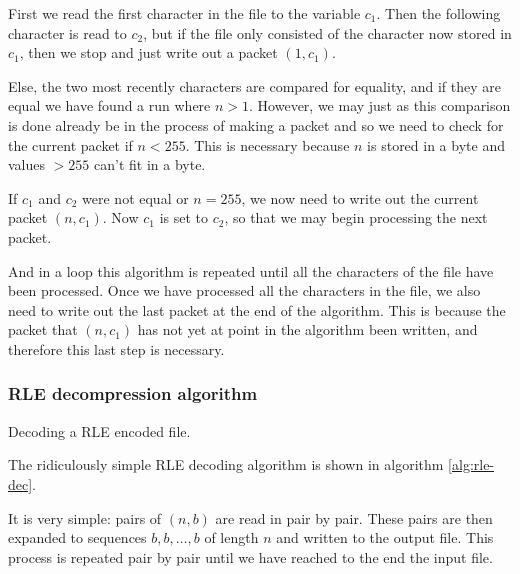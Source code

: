 First we read the first character in the file to the variable
$c_1$. Then the following character is read to $c_2$, but if the file
only consisted of the character now stored in $c_1$, then we stop and
just write out a packet $(1,c_1)$.

Else, the two most recently characters are compared for equality, and
if they are equal we have found a run where $n > 1$. However, we may
just as this comparison is done already be in the process of making a
packet and so we need to check for the current packet if $n <
255$. This is necessary because $n$ is stored in a byte and values $>
255$ can't fit in a byte.

If $c_1$ and $c_2$ were not equal or $n = 255$, we now need to write
out the current packet $(n,c_1)$. Now $c_1$ is set to $c_2$, so that
we may begin processing the next packet.

And in a loop this algorithm is repeated until all the characters of
the file have been processed. Once we have processed all the
characters in the file, we also need to write out the last packet at
the end of the algorithm. This is because the packet that $(n,c_1)$
has not yet at point in the algorithm been written, and therefore this
last step is necessary.

\subsubsection{RLE decompression algorithm}

\begin{algorithm}
  \caption{Decoding a RLE encoded file.}
  \label{alg:rle-dec}
  \begin{algorithmic}[1]


    \While{\neof}
    \State {}
    \EndRepeatn


    \EndWhile
  \end{algorithmic}
\end{algorithm}

The ridiculously simple RLE decoding algorithm is shown in algorithm
\ref{alg:rle-dec}.

It is very simple: pairs of $(n,b)$ are read in pair by pair. These
pairs are then expanded to sequences $b,b,\dots,b$ of length $n$ and
written to the output file. This process is repeated pair by pair
until we have reached to the end the input file.

